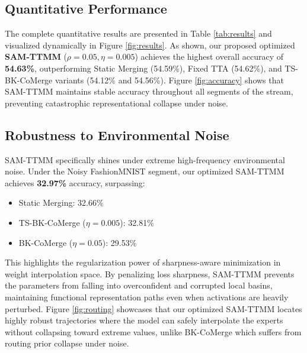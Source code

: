 \documentclass{article}
\theoremstyle{plain}
\theoremstyle{definition}
\theoremstyle{remark}
\begin{document}
\subsection{Quantitative Performance}
The complete quantitative results are presented in Table \ref{tab:results} and visualized dynamically in Figure \ref{fig:results}.
As shown, our proposed optimized \textbf{SAM-TTMM} ($\rho=0.05, \eta=0.005$) achieves the highest overall accuracy of \textbf{54.63\%}, outperforming Static Merging (54.59\%), Fixed TTA (54.62\%), and TS-BK-CoMerge variants (54.12\% and 54.56\%). Figure \ref{fig:accuracy} shows that SAM-TTMM maintains stable accuracy throughout all segments of the stream, preventing catastrophic representational collapse under noise.

\subsection{Robustness to Environmental Noise}
SAM-TTMM specifically shines under extreme high-frequency environmental noise. Under the Noisy FashionMNIST segment, our optimized SAM-TTMM achieves \textbf{32.97\%} accuracy, surpassing:
\begin{itemize}
    \item Static Merging: 32.66\%
    \item TS-BK-CoMerge ($\eta=0.005$): 32.81\%
    \item BK-CoMerge ($\eta=0.05$): 29.53\%
\end{itemize}
This highlights the regularization power of sharpness-aware minimization in weight interpolation space. By penalizing loss sharpness, SAM-TTMM prevents the parameters from falling into overconfident and corrupted local basins, maintaining functional representation paths even when activations are heavily perturbed. Figure \ref{fig:routing} showcases that our optimized SAM-TTMM locates highly robust trajectories where the model can safely interpolate the experts without collapsing toward extreme values, unlike BK-CoMerge which suffers from routing prior collapse under noise.
\end{document}
